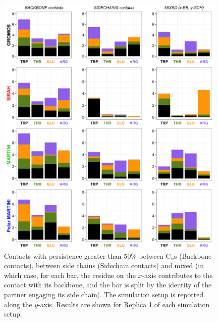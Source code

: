 \begin{figure}[p]
\centering
\includegraphics[width=0.95\linewidth]{3results_capsule/pics/new_rep1_allFF.png}
\caption[Contacts between molecules during simulations of the buckyball]{Contacts with persistence greater than 50\% between C$_\alpha$s (Backbone contacts), between side chains (Sidechain contacts) and mixed (in which case, for each bar, the residue on the $x$-axis contributes to the contact with its backbone, and the bar is split by the identity of the partner engaging its side chain). The simulation setup is reported along the $y$-axis. Results are shown for Replica 1 of each simulation setup.}
\label{fig:BTI_cont}
\end{figure}

